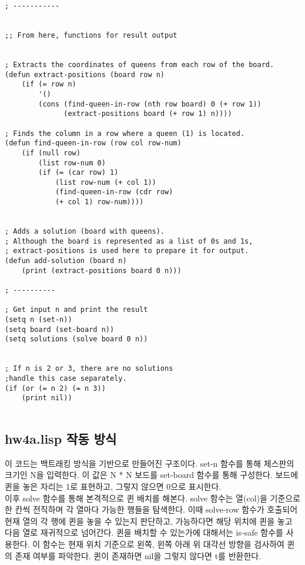 \documentclass{article}
\begin{document}
\begin{lstlisting}
; -----------


;; From here, functions for result output


; Extracts the coordinates of queens from each row of the board.
(defun extract-positions (board row n)
	(if (= row n)
		'()
		(cons (find-queen-in-row (nth row board) 0 (+ row 1))
		      (extract-positions board (+ row 1) n))))

; Finds the column in a row where a queen (1) is located.
(defun find-queen-in-row (row col row-num)
	(if (null row)
		(list row-num 0)
		(if (= (car row) 1)
			(list row-num (+ col 1))
			(find-queen-in-row (cdr row) 
            (+ col 1) row-num))))


; Adds a solution (board with queens).
; Although the board is represented as a list of 0s and 1s,
; extract-positions is used here to prepare it for output.
(defun add-solution (board n)
	(print (extract-positions board 0 n)))

; ----------

; Get input n and print the result
(setq n (set-n))
(setq board (set-board n))
(setq solutions (solve board 0 n))


; If n is 2 or 3, there are no solutions 
;handle this case separately.
(if (or (= n 2) (= n 3))
	(print nil))


\end{lstlisting}

\newpage







\subsection{hw4a.lisp 작동 방식}
이 코드는 백트래킹 방식을 기반으로 만들어진 구조이다. set-n 함수를 통해 체스판의 크기인 N을 입력한다. 이 값은 N * N 보드를 set-board 함수를 통해 구성한다. 보드에 퀸을 놓은 자리는 1로 표현하고, 그렇지 않으면 0으로 표시한다. \\ 

이후 solve 함수를 통해 본격적으로 퀸 배치를 해본다. solve 함수는 열(col)을 기준으로 한 칸씩 전직하며 각 열마다 가능한 행들을 탐색한다. 이때 solve-row 함수가 호출되어 현재 열의 각 행에 퀸을 놓을 수 있는지 판단하고, 가능하다면 해당 위치에 퀸을 놓고 다음 열로 재귀적으로 넘어간다. 퀸을 배치할 수 있는가에 대해서는 is-safe 함수를 사용한다. 이 함수는 현재 위치 기준으로 왼쪽, 왼쪽 아래 위 대각선 방향을 검사하여 퀸의 존재 여부를 파악한다. 퀸이 존재하면 nil을 그렇지 않다면 t를 반환한다. \\
\end{document}
